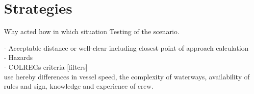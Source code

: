 \chapter{Strategies}

Why acted how in which situation
Testing of the scenario.

- Acceptable distance or well-clear including closest point of approach calculation\\
- Hazards\\
- COLREGs criteria [filters]\\

use hereby differences in vessel speed, the complexity of waterways, availability of rules and sign, knowledge and experience of crew.